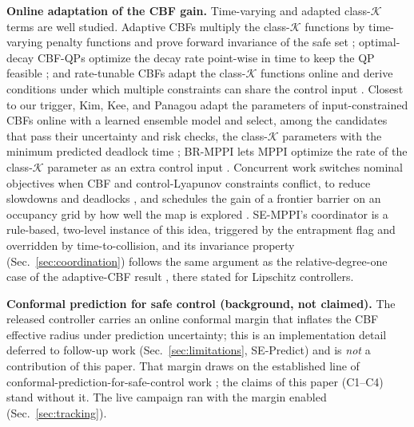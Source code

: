 \documentclass[journal]{IEEEtran}
\begin{document}
\textbf{Online adaptation of the CBF gain.} Time-varying and adapted
class-$\mathcal{K}$ terms are well studied. Adaptive CBFs multiply the
class-$\mathcal{K}$ functions by time-varying penalty functions and prove
forward invariance of the safe set \cite{ada_cbf}; optimal-decay CBF-QPs
optimize the decay rate point-wise in time to keep the QP feasible
\cite{optdecay_cbf}; and rate-tunable CBFs adapt the class-$\mathcal{K}$
functions online and derive conditions under which multiple constraints
can share the control input \cite{rt_cbf}. Closest to our trigger, Kim,
Kee, and Panagou adapt the parameters of input-constrained CBFs online
with a learned ensemble model and select, among the candidates that pass
their uncertainty and risk checks, the class-$\mathcal{K}$ parameters with
the minimum predicted deadlock time \cite{kim_adaptive_cbf}; BR-MPPI lets
MPPI optimize the rate of the class-$\mathcal{K}$ parameter as an extra
control input \cite{br_mppi}.
Concurrent work switches nominal objectives when CBF and control-Lyapunov
constraints conflict, to reduce slowdowns and deadlocks
\cite{walia_conflict}, and schedules the gain of a frontier barrier on an
occupancy grid by how well the map is explored \cite{paudel_dualbarrier}.
SE-MPPI's coordinator is a rule-based, two-level instance of this idea,
triggered by the entrapment flag and overridden by time-to-collision, and
its invariance property (Sec.~\ref{sec:coordination}) follows the same
argument as the relative-degree-one case of the adaptive-CBF result
\cite[Thm.~3]{ada_cbf}, there stated for Lipschitz controllers.

\textbf{Conformal prediction for safe control (background, not claimed).}
The released controller carries an online conformal margin that inflates
the CBF effective radius under prediction uncertainty; this is an
implementation detail deferred to follow-up work
(Sec.~\ref{sec:limitations}, SE-Predict) and is \emph{not} a contribution of
this paper. That margin draws on the established line of
conformal-prediction-for-safe-control work
\cite{acp_yang,conformal_hri,lindemann,dixit,ua_pcbf}; the claims of this
paper (C1--C4) stand without it. The live campaign ran with the margin
enabled (Sec.~\ref{sec:tracking}).
\end{document}
